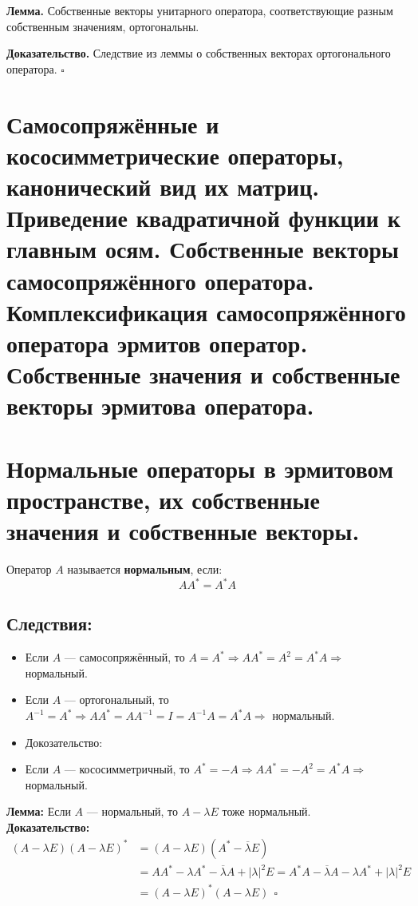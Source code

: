 \documentclass[12pt]{article}
\begin{document}
\textbf{Лемма.} Собственные векторы унитарного оператора, соответствующие
 разным собственным значениям, ортогональны.

 \textbf{Доказательство.}
 Следствие из леммы о собственных векторах ортогонального оператора. $\square$
 
 \section{Самосопряжённые и кососимметрические операторы, канонический вид их матриц. Приведение квадратичной функции к главным осям. Собственные векторы самосопряжённого оператора. Комплексификация самосопряжённого оператора эрмитов оператор. Собственные значения и собственные векторы эрмитова оператора.}

 \section{Нормальные операторы в эрмитовом пространстве, их собственные значения и собственные векторы.}

Оператор \( A \) называется \textbf{нормальным}, если:
\[
A A^* = A^* A
\]

\subsection*{Следствия:}

\begin{itemize}
    \item Если \( A \) --- самосопряжённый, то \( A = A^* \Rightarrow AA^* = A^2 = A^*A \Rightarrow \) нормальный.
    \item Если \( A \) --- ортогональный, то \( A^{-1} = A^* \Rightarrow AA^* = A A^{-1} = I = A^{-1}A = A^*A \Rightarrow \) нормальный.
    \item Докозательство:
    \item Если \( A \) --- кососимметричный, то \( A^* = -A \Rightarrow AA^* = -A^2 = A^*A \Rightarrow \) нормальный.
\end{itemize}

\textbf{Лемма:} Если \( A \) --- нормальный, то \( A - \lambda E \) тоже нормальный.
\\
\textbf{Доказательство:}
\begin{align*}
    (A - \lambda E)(A - \lambda E)^* &= (A - \lambda E)(A^* - \overline{\lambda} E) \\
    &= AA^* - \lambda A^* - \overline{\lambda} A + |\lambda|^2 E = A^*A - \overline{\lambda} A - \lambda A^* + |\lambda|^2 E \\
    &= (A - \lambda E)^*(A - \lambda E) \ \ \square
\end{align*}
\end{document}
